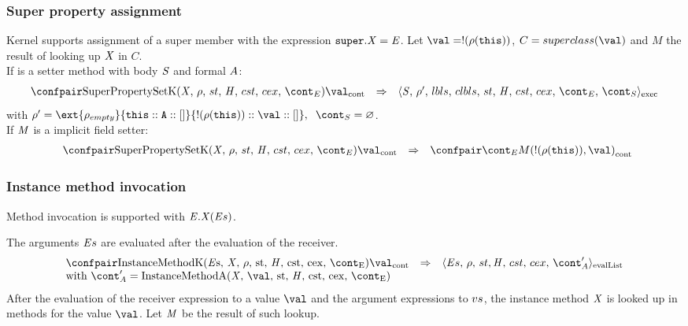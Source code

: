 \documentclass{article}
\renewcommand{\emptyset}{\varnothing}
\begin{document}
\subsubsection{Super property assignment}
\label{subsubsec:super-property-assignemnt}
Kernel supports assignment of a super member with the expression $\tt{super}.\mathit{X}=\mathit{E}$.
Let $\val = \deref{(\env(\this))}$, $C = \superclass{\val}$ and $M$ the result of looking up $\mathit{X}$ in $C$.\\
If is a setter method with body $\mathit{S}$ and formal $A$:
\[
  \begin{array}{lcl}
	\cesktrans{
		\contconf{\SuperPropertySetK}{\val}}{
		\execconf{\stmt}{\env'}{\lbls}{\clbls}{\handler}{\cstrace}{\cex}{\econt}{\scont}}\\
  \end{array}
\]
with $\env' =  \ext{\env_{empty}}{\this :: \formal :: []}{\deref{(\env(\this))} :: \val :: []}, \hspace{2mm}\scont = \emptyset$.\\
If $\mathit{M}$ is a implicit field setter:
\[
  \begin{array}{lcl}
	\hspace{2mm}
	\cesktrans{
		\contconf{\SuperPropertySetK}{\val}}{
		\contconf{\econt}{M(\deref{(\env(\this))}, \val)}}
  \end{array}
\]
\subsubsection{Instance method invocation}
\label{subsubsec:instance-method-invoc}
Method invocation is supported with $\mathit{E}.\mathit{X}(\mathit{E}{s})$.

\noindent
The arguments $\mathit{E}{s}$ are evaluated after the evaluation of the receiver.
\newcommand{\InstanceMethodInvocationArgsApp}{\mathrm{InstanceMethodA(\idmeta,\,\val,\,\strace,\,\handler,\,\cstrace,\,\cex,\,\econt)}}
\[
  \begin{array}{lcl}
	\cesktrans{
		\contconf{\InstanceMethodK}{\val}}{
		\evallistconf{\expressionsmeta}{\env}{\strace}{\cstrace}{\cex}{\acont'}}
	\\
	\textrm{with } \acont' = \InstanceMethodInvocationArgsApp
  \end{array}
\]
\noindent
After the evaluation of the receiver expression to a value $\val$ and the argument expressions to $vs$, the instance method $\mathit{X}$ is looked up in methods for the value $\val$.
Let $\mathit{M}$ be the result of such lookup.
\end{document}
